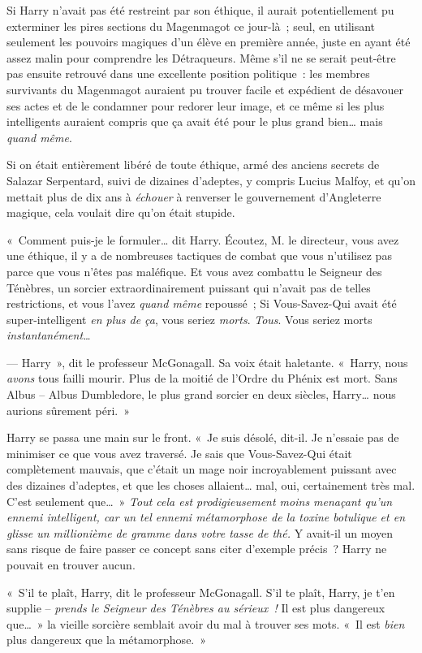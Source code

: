 Si Harry n'avait pas été restreint par son éthique, il aurait potentiellement pu exterminer les pires sections du Magenmagot ce jour-là~; seul, en utilisant seulement les pouvoirs magiques d'un élève en première année, juste en ayant été assez malin pour comprendre les Détraqueurs.
Même s'il ne se serait peut-être pas ensuite retrouvé dans une excellente position politique~: les membres survivants du Magenmagot auraient pu trouver facile et expédient de désavouer ses actes et de le condamner pour redorer leur image, et ce même si les plus intelligents auraient compris que ça avait été pour le plus grand bien… mais \emph{quand même}.

Si on était entièrement libéré de toute éthique, armé des anciens secrets de Salazar Serpentard, suivi de dizaines d'adeptes, y compris Lucius Malfoy, et qu'on mettait plus de dix ans à \emph{échouer} à renverser le gouvernement d'Angleterre magique, cela voulait dire qu'on était stupide.

«~Comment puis-je le formuler… dit Harry.
Écoutez, M. le directeur, vous avez une éthique, il y a de nombreuses tactiques de combat que vous n'utilisez pas parce que vous n'êtes pas maléfique.
Et vous avez combattu le Seigneur des Ténèbres, un sorcier extraordinairement puissant qui n'avait pas de telles restrictions, et vous l'avez \emph{quand même} repoussé~; Si Vous-Savez-Qui avait été super-intelligent \emph{en plus de ça}, vous seriez \emph{morts}.
\emph{Tous}.
Vous seriez morts \emph{instantanément…}

--- Harry~», dit le professeur McGonagall.
Sa voix était haletante.
«~Harry, nous \emph{avons} tous failli mourir.
Plus de la moitié de l'Ordre du Phénix est mort.
Sans Albus -- Albus Dumbledore, le plus grand sorcier en deux siècles, Harry… nous aurions sûrement péri.~»

Harry se passa une main sur le front.
«~Je suis désolé, dit-il.
Je n'essaie pas de minimiser ce que vous avez traversé.
Je sais que Vous-Savez-Qui était complètement mauvais, que c'était un mage noir incroyablement puissant avec des dizaines d'adeptes, et que les choses allaient… mal, oui, certainement très mal.
C'est seulement que…~»
\emph{Tout cela est prodigieusement moins menaçant qu'un ennemi intelligent, car un tel ennemi métamorphose de la toxine botulique et en glisse un millionième de gramme dans votre tasse de thé.} Y avait-il un moyen sans risque de faire passer ce concept sans citer d'exemple précis~?
Harry ne pouvait en trouver aucun.

«~S'il te plaît, Harry, dit le professeur McGonagall.
S'il te plaît, Harry, je t'en supplie -- \emph{prends le Seigneur des Ténèbres au sérieux~!} Il est plus dangereux que…~»
la vieille sorcière semblait avoir du mal à trouver ses mots.
«~Il est \emph{bien} plus dangereux que la métamorphose.~»

